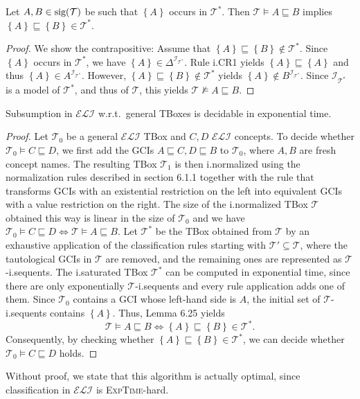 \begin{lemma}[completeness]
	Let $A,B \in \operatorname{\text{sig}}(\mathcal{T})$ be such that $\left\{ A \right\}$ occurs in $\mathcal{T}^*$.
	Then $\mathcal{T} \vDash A \sqsubseteq B$ implies $\left\{ A \right\} \sqsubseteq \left\{ B \right\} \in \mathcal{T}^*$.
\end{lemma}
\begin{proof}
	We show the contrapositive:
	Assume that $\left\{ A \right\} \sqsubseteq \left\{ B \right\} \notin \mathcal{T}^*$.
	Since $\left\{ A \right\}$ occurs in $\mathcal{T}^*$, we have $\left\{ A \right\} \in \Delta^{\mathcal{I}_{\mathcal{T}^*}}$.
	Rule i.CR1 yields $\left\{ A \right\} \sqsubseteq \left\{ A \right\}$ 
	and thus $\left\{ A \right\} \in A^{\mathcal{I}_{\mathcal{T}^*}}$.
	However, $\left\{ A \right\} \sqsubseteq \left\{ B \right\} \notin \mathcal{T}^*$ yields
	$\left\{ A \right\} \notin B^{\mathcal{I}_{\mathcal{T}^*}}$.
	Since $\mathcal{I}_{\mathcal{T}^*}$ is a model of $\mathcal{T}^*$, and thus of $\mathcal{T}$,
	this yields $\mathcal{T} \not\vDash A \sqsubseteq B$.
\end{proof}

\begin{theorem}
	Subsumption in $\mathcal{ELI}$ w.r.t.\ general TBoxes is decidable in exponential time.
\end{theorem}
\begin{proof}
	Let $\mathcal{T}_0$ be a general $\mathcal{ELI}$ TBox and $C, D$ $\mathcal{ELI}$ concepts.
	To decide whether $\mathcal{T}_0 \vDash C \sqsubseteq D$, we first add the GCIs $A \sqsubseteq C, D \sqsubseteq B$ 
	to $\mathcal{T}_0$, where $A, B$ are fresh concept names.
	The resulting TBox $\mathcal{T}_1$ is then i.normalized using the normalization rules described in section 6.1.1
	together with the rule that transforms GCIs with an existential restriction on the left
	into equivalent GCIs with a value restriction on the right.
	The size of the i.normalized TBox $\mathcal{T}$ obtained this way is linear in the size of $\mathcal{T}_0$ 
	and we have $\mathcal{T}_0 \vDash C \sqsubseteq D \iff \mathcal{T} \vDash A \sqsubseteq B$.
	Let $\mathcal{T}^*$ be the TBox obtained from $\mathcal{T}$ by an exhaustive application of the classification rules starting with $\mathcal{T}' \subseteq \mathcal{T}$,
	where the tautological GCIs in $\mathcal{T}$ are removed, and the remaining ones are represented as $\mathcal{T}$-i.sequents.
	The i.saturated TBox $\mathcal{T}^*$ can be computed in exponential time, since there are only exponentially $\mathcal{T}$-i.sequents
	and every rule application adds one of them.
	Since $\mathcal{T}_0$ contains a GCI whose left-hand side is $A$, the initial set of $\mathcal{T}$-i.sequents contains $\left\{ A \right\}$.
	Thus, Lemma 6.25 yields
	\[
	\mathcal{T} \vDash A \sqsubseteq B \iff \left\{ A \right\} \sqsubseteq \left\{ B \right\} \in \mathcal{T}^*
	.\]
	Consequently, by checking whether $\left\{ A \right\} \sqsubseteq \left\{ B \right\} \in \mathcal{T}^*$,
	we can decide whether $\mathcal{T}_0 \vDash C \sqsubseteq D$ holds.
\end{proof}
Without proof, we state that this algorithm is actually optimal, since classification in $\mathcal{ELI}$ is \textsc{ExpTime}-hard.

